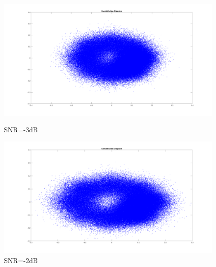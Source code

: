 \begin{spacing}{1.5}
\begin{figure}[H]
\begin{minipage}[t]{0.5\linewidth}
\centering
\includegraphics[width=0.9\columnwidth]{constellation3.png}
\caption{SNR=-3dB}
\end{minipage}
\hfill
\begin{minipage}[t]{0.5\linewidth}
\centering
\includegraphics[width=0.9\columnwidth]{constellation4.png}
\caption{SNR=-2dB}
\end{minipage}
\end{figure}



\end{spacing}
